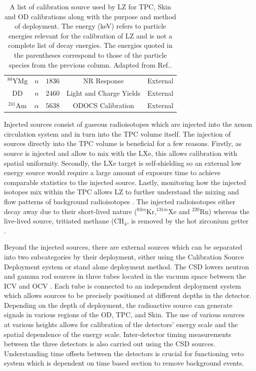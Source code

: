 \begin{table}[h!]
\begin{tabular}{|c|c|c|c|c|}
         $^{88}\text{YMg}$& $n$ & $1836$ & NR Response & External\\
         DD& $n$ & $2460$ & Light and Charge Yields & External\\
         $^{241}\text{Am}$& $\alpha$ & $5638$ &ODOCS Calibration & External\\
         \hline
    \end{tabular}
    \caption{A list of calibration source used by LZ for TPC, Skin and OD calibrations along with the purpose and method of deployment. The energy (keV) refers to particle energies relevant for the calibration of LZ and is not a complete list of decay energies. The energies quoted in the parentheses correspond to those of the particle species from the previous column. Adapted from Ref.\cite{LZ:2024bsz,lkorley:thesis}.}
    \label{tab:CalibrationSources}
\end{table}
Injected sources consist of gaseous radioisotopes which are injected into the xenon circulation system and in turn into the TPC volume itself. The injection of sources directly into the TPC volume is beneficial for a few reasons. Firstly, as source is injected and allow to mix with the LXe, this allows calibration with spatial uniformity. Secondly, the LXe target is self-shielding so an external low energy source would require a large amount of exposure time to achieve comparable statistics to the injected source. Lastly, monitoring how the injected isotopes mix within the TPC allows LZ to further understand the mixing and flow patterns of background radioisotopes \cite{LZ:2024bsz}. The injected radioisotopes either decay away due to their short-lived nature ($^{83m}\text{Kr}$,$^{131m}\text{Xe}$ and $^{220}\text{Rn}$) whereas the live-lived source, tritiated methane ($\text{CH}_4$, is removed by the hot zirconium getter \cite{LZNIMA}.

Beyond the injected sources, there are external sources which can be separated into two subcategories by their deployment, either using the Calibration Source Deployment system or stand alone deployment method. The CSD lowers neutron and gamma rod sources in three tubes located in the vacuum space between the ICV and OCV \cite{LZNIMA}. Each tube is connected to an independent deployment system which allows sources to be precisely positioned at different depths in the detector. Depending on the depth of deployment, the radioactive source can generate signals in various regions of the OD, TPC, and Skin. The use of various sources at various heights allows for calibration of the detectors' energy scale and the spatial dependence of the energy scale. Inter-detector timing measurements between the three detectors is also carried out using the CSD sources. Understanding time offsets between the detectors is crucial for functioning veto system which is dependent on time based section to remove background events.

